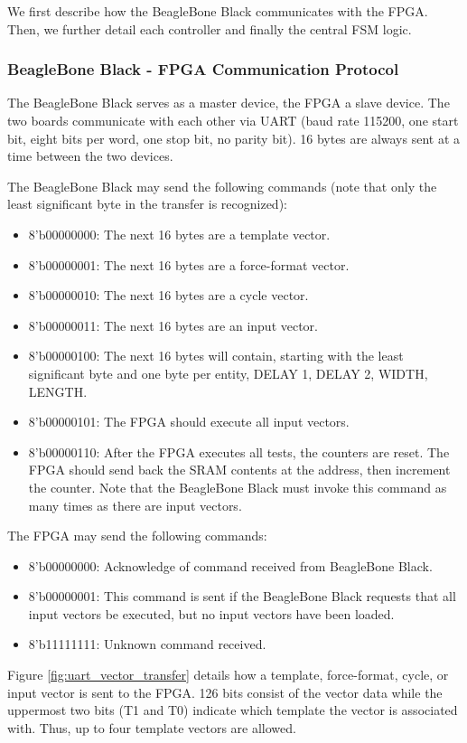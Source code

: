 We first describe how the BeagleBone Black communicates with the FPGA. Then, we further detail each controller and finally the central FSM logic.

\subsubsection{BeagleBone Black - FPGA Communication Protocol}
The BeagleBone Black serves as a master device, the FPGA a slave device. The two boards communicate with each other via UART (baud rate 115200, one start bit, eight bits per word, one stop bit, no parity bit). 16 bytes are always sent at a time between the two devices.

The BeagleBone Black may send the following commands (note that only the least significant byte in the transfer is recognized): 
\begin{itemize}
\item 8'b00000000: The next 16 bytes are a template vector.
\item 8'b00000001: The next 16 bytes are a force-format vector.
\item 8'b00000010: The next 16 bytes are a cycle vector.
\item 8'b00000011: The next 16 bytes are an input vector.
\item 8'b00000100: The next 16 bytes will contain, starting with the least significant byte and one byte per entity, DELAY 1, DELAY 2, WIDTH, LENGTH.
\item 8'b00000101: The FPGA should execute all input vectors.
\item 8'b00000110: After the FPGA executes all tests, the counters are reset. The FPGA should send back the SRAM contents at the address, then increment the counter. Note that the BeagleBone Black must invoke this command as many times as there are input vectors.
\end{itemize}

The FPGA may send the following commands: 
\begin{itemize}
\item 8'b00000000: Acknowledge of command received from BeagleBone Black.
\item 8'b00000001: This command is sent if the BeagleBone Black requests that all input vectors be executed, but no input vectors have been loaded.
\item 8'b11111111: Unknown command received.
\end{itemize}

Figure \ref{fig:uart_vector_transfer} details  how a template, force-format, cycle, or input vector is sent to the FPGA. 126 bits consist of the vector data while the uppermost two bits (T1 and T0) indicate which template the vector is associated with. Thus, up to four template vectors are allowed.

